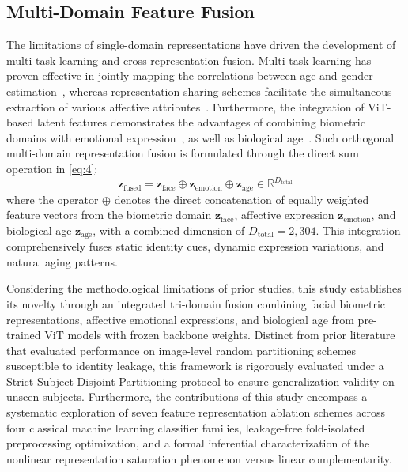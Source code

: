 \subsection{Multi-Domain Feature Fusion}
\label{sec:multidomain_feature_fusion}

The limitations of single-domain representations have driven the development of multi-task learning and cross-representation fusion. Multi-task learning has proven effective in jointly mapping the correlations between age and gender estimation~\cite{ref12}, whereas representation-sharing schemes facilitate the simultaneous extraction of various affective attributes~\cite{ref16}. Furthermore, the integration of ViT-based latent features demonstrates the advantages of combining biometric domains with emotional expression~\cite{ref19}, as well as biological age~\cite{ref20}. Such orthogonal multi-domain representation fusion is formulated through the direct sum operation in \eqref{eq:4}:
\begin{equation}
\mathbf{z}_{\text{fused}} = \mathbf{z}_{\text{face}} \oplus \mathbf{z}_{\text{emotion}} \oplus \mathbf{z}_{\text{age}} \in \mathbb{R}^{D_{\text{total}}}
\label{eq:4}
\end{equation}
where the operator $\oplus$ denotes the direct concatenation of equally weighted feature vectors from the biometric domain $\mathbf{z}_{\text{face}}$, affective expression $\mathbf{z}_{\text{emotion}}$, and biological age $\mathbf{z}_{\text{age}}$, with a combined dimension of $D_{\text{total}} = 2{,}304$. This integration comprehensively fuses static identity cues, dynamic expression variations, and natural aging patterns.

Considering the methodological limitations of prior studies, this study establishes its novelty through an integrated tri-domain fusion combining facial biometric representations, affective emotional expressions, and biological age from pre-trained ViT models with frozen backbone weights. Distinct from prior literature that evaluated performance on image-level random partitioning schemes susceptible to identity leakage, this framework is rigorously evaluated under a Strict Subject-Disjoint Partitioning protocol to ensure generalization validity on unseen subjects. Furthermore, the contributions of this study encompass a systematic exploration of seven feature representation ablation schemes across four classical machine learning classifier families, leakage-free fold-isolated preprocessing optimization, and a formal inferential characterization of the nonlinear representation saturation phenomenon versus linear complementarity.
